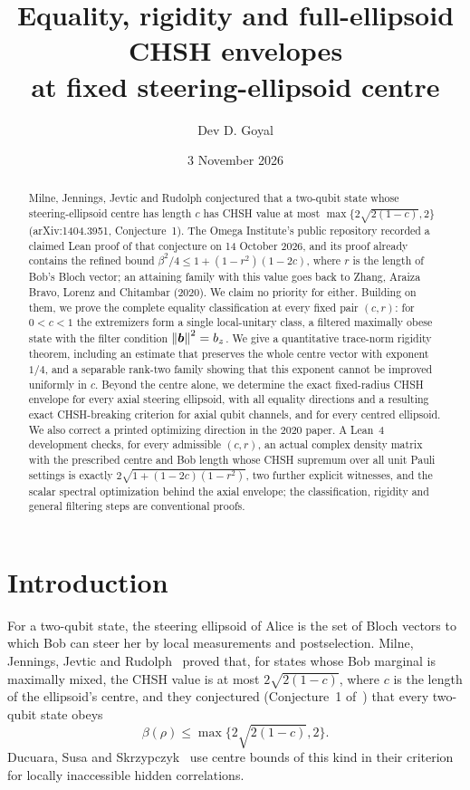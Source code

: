 \documentclass[11pt]{article}
\title{Equality, rigidity and full-ellipsoid CHSH envelopes\protect\\
at fixed steering-ellipsoid centre}
\author{Dev D. Goyal}
\date{3 November 2026}
\theoremstyle{remark}\newtheorem{remark}[theorem]{Remark}
\newcommand{\norm}[1]{\left\lVert#1\right\rVert}
\begin{document}
\maketitle
\begin{abstract}
Milne, Jennings, Jevtic and Rudolph conjectured that a two-qubit state whose
steering-ellipsoid centre has length $c$ has CHSH value at most
$\max\{2\sqrt{2(1-c)},2\}$ (arXiv:1404.3951, Conjecture~1). The Omega
Institute's public repository recorded a claimed Lean proof of that conjecture
on 14 October 2026, and its proof already contains the refined bound
$\beta^2/4\le 1+(1-r^2)(1-2c)$, where $r$ is the length of Bob's Bloch vector;
an attaining family with this value goes back to Zhang, Araiza Bravo, Lorenz
and Chitambar (2020). We claim no priority for either. Building on them, we prove the
complete equality classification at every fixed pair $(c,r)$: for $0<c<1$ the
extremizers form a single local-unitary class, a filtered maximally obese state
with the filter condition $\norm{\bv}^2=b_z$. We give a quantitative trace-norm
rigidity theorem, including an estimate that preserves the whole centre vector
with exponent $1/4$, and a separable rank-two family showing that this exponent
cannot be improved uniformly in $c$. Beyond the centre alone, we determine the
exact fixed-radius CHSH envelope for every axial steering ellipsoid, with all
equality directions and a resulting exact CHSH-breaking criterion for axial
qubit channels, and for every centred ellipsoid. We also correct a printed
optimizing direction in the 2020 paper. A Lean~4 development checks, for every
admissible $(c,r)$, an actual complex density matrix with the prescribed centre
and Bob length whose CHSH supremum over all unit Pauli settings is exactly
$2\sqrt{1+(1-2c)(1-r^2)}$, two further explicit witnesses, and the scalar
spectral optimization behind the axial envelope; the classification, rigidity
and general filtering steps are conventional proofs.
\end{abstract}

\section{Introduction}

For a two-qubit state, the steering ellipsoid of Alice is the set of Bloch
vectors to which Bob can steer her by local measurements and postselection.
Milne, Jennings, Jevtic and Rudolph~\cite{milne} proved that, for states whose
Bob marginal is maximally mixed, the CHSH value is at most
$2\sqrt{2(1-c)}$, where $c$ is the length of the ellipsoid's centre, and they
conjectured (Conjecture~1 of~\cite{milne}) that every two-qubit state obeys
\begin{equation}\label{eq:milne}
 \beta(\rho)\le\max\{2\sqrt{2(1-c)},2\}.
\end{equation}
Ducuara, Susa and Skrzypczyk~\cite{ducuara} use centre bounds of this kind
in their criterion for locally inaccessible hidden correlations.
\end{document}
